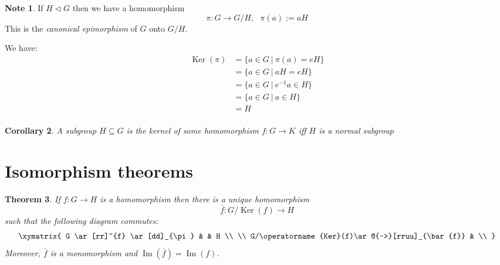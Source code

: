 \documentclass[12pt, letterpaper, oneside]{article}
\theoremstyle{plain}
\newtheorem{theorem}{Theorem}[section]
\newtheorem{corollary}[theorem]{Corollary}
\theoremstyle{definition}
\newtheorem{note}[theorem]{Note}
\renewcommand{\Im}{\operatorname{Im}}
\newcommand{\Ker}{\operatorname{Ker}}
\newcommand{\vs}{\vskip 5mm}
\begin{document}
\vs

\begin{note}
If $H\lhd G$ then we have a homomorphism
$$\pi\colon G \to G/H, \ \ \ \pi(a) := aH$$
This is the  \emph{canonical epimorphism} of $G$ onto $G/H$.

We have:
\begin{align*}
\Ker(\pi) & = \{a\in G \ | \  \pi(a) = eH \} \\
&  = \{ a\in G \ | \ aH = eH \} \\
& = \{ a\in G \ |  \ e^{-1}a \in H \} \\
& = \{a\in G \ | \ a\in H \} \\
& = H \\
\end{align*}
\end{note}

\vs 

\begin{corollary}
A subgroup $H\subseteq G$ is the kernel of some homomorphism $f\colon G \to K$ iff
$H$ is a normal subgroup
\end{corollary}

\vs






\newpage
\section{Isomorphism theorems}
\label{SEC_ISOTHMS}



\begin{theorem}
\label{THM_HOMOMFACT}
If $f\colon G\to H$ is a homomorphism then there is a unique  homomorphism 
$$\bar{f}\colon G/\Ker(f) \to H$$
such that the following diagram commutes:
$$
\xymatrix{
G \ar[rr]^{f} \ar[dd]_{\pi} & & H \\
\\
G/\Ker(f)\ar@{-->}[rruu]_{\bar{f}} & \\
}
$$
Moreover, $\bar{f}$ is a monomorphism and $\Im(\bar{f})= \Im(f)$. 
\end{theorem}
\end{document}
